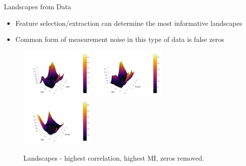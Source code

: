 \documentclass{beamer}
\begin{document}
\begin{frame}{Landscapes from Data}
\begin{itemize}
\item Feature selection/extraction can determine the most informative landscapes
\item Common form of measurement noise in this type of data is false zeros
\end{itemize}
\begin{figure}
\centering
\includegraphics[width=0.33\textwidth]{Fgf4_Gdf3_data.png}
\includegraphics[width=0.33\textwidth]{Fgf4_Pou5f1_data.png}
\includegraphics[width=0.33\textwidth]{Fgf4_Pou5f1_data_skipzeros.png}
\caption{Landscapes - highest correlation, highest MI, zeros removed.}
\end{figure}
\end{frame}
\end{document}

